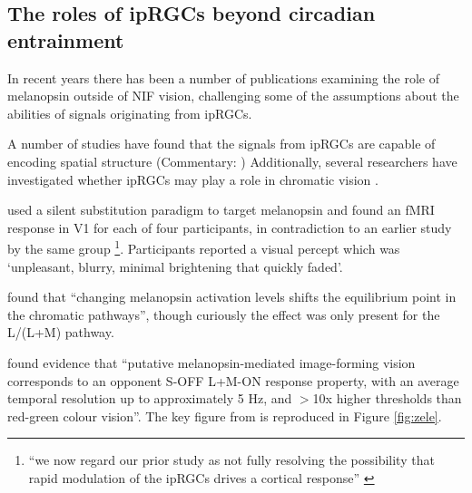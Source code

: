 \subsection{The roles of ipRGCs beyond circadian entrainment}
\label{sec:ipRGCbeyond}

In recent years there has been a number of publications examining the role of melanopsin outside of \gls{NIF} vision, challenging some of the assumptions about the abilities of signals originating from \glspl{ipRGC}.

A number of studies have found that the signals from ipRGCs are capable of encoding spatial structure \citep{ecker_melanopsin-expressing_2010, mouland_responses_2017, allen_melanopsin_2017, allen_form_2019, zhao_photoresponse_2014} (Commentary: \citet{spitschan_vision_2017,sonoda_re-evaluating_2016})
%
Additionally, several researchers have investigated whether \glspl{ipRGC} may play a role in chromatic vision \citep{cao_evidence_2018, spitschan_human_2017-1,zele_melanopsin_2018}.

\citet{spitschan_human_2017-1} used a silent substitution paradigm to target melanopsin and found an fMRI response in V1 for each of four participants, in contradiction to an earlier study by the same group \citep{spitschan_human_2016}\footnote{``we now regard our prior study as not fully resolving the possibility that rapid modulation of the ipRGCs drives a cortical response'' \citep{spitschan_human_2017-1}}. Participants reported a visual percept which was `unpleasant, blurry, minimal brightening that quickly faded'.

\citet{cao_evidence_2018} found that ``changing melanopsin activation levels shifts the equilibrium point in the chromatic pathways'', though curiously the effect was only present for the L/(L+M) pathway.

\citet{zele_melanopsin_2018} found evidence that ``putative melanopsin-mediated image-forming vision corresponds to an opponent S-OFF L+M-ON response property, with an average temporal resolution up to approximately 5 Hz, and $>$10x higher thresholds than red-green colour vision''. The key figure from \citet{zele_melanopsin_2018} is reproduced in Figure \ref{fig:zele}.

